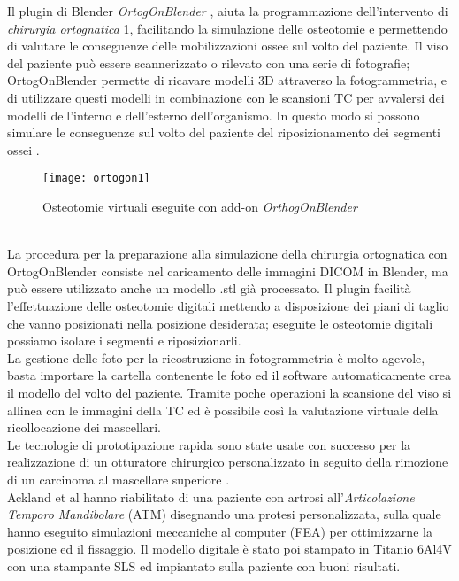 Il plugin di Blender \emph{OrtogOnBlender} \parencite{Reference64}, \parencite{Reference79} aiuta la programmazione dell'inter\-vento di \emph{chirurgia ortognatica} \ref{fig:ortogon1}, facilitando la simulazione delle osteotomie e permettendo di valutare le conseguenze delle mobilizzazioni ossee sul volto del paziente. Il viso del paziente può essere scannerizzato o rilevato con una serie di fotografie; OrtogOnBlender permette di ricavare modelli 3D attraverso la fotogrammetria, e di utilizzare questi modelli in combinazione con le scansioni TC per avvalersi dei modelli dell'interno e dell'esterno dell'orga\-nismo. In questo modo si possono simulare le conseguenze sul volto del paziente del riposizionamento dei segmenti ossei \parencite{Reference145}.
\begin{figure}[h]
\vspace{-10pt}
	\begin{center}
	\texttt{[image: ortogon1]}
    \caption{Osteotomie virtuali eseguite con add-on \emph{OrthogOnBlender}}
    \label{fig:ortogon1}
    \end{center}
\vspace{-20pt}
\end{figure}
\\
La procedura per la preparazione alla simulazione della chirurgia ortognatica con OrtogOnBlender \parencite{Reference80} consiste nel caricamento delle immagini DICOM in Blender, ma può essere utilizzato anche un modello .stl già processato. Il plugin facilità l'effettuazione delle osteotomie digitali mettendo a disposizione dei piani di taglio che vanno posizionati nella posizione desiderata; eseguite le osteotomie digitali possiamo isolare i segmenti e riposizionarli.\\
La gestione delle foto per la ricostruzione in fotogrammetria è molto agevole, basta importare la cartella contenente le foto ed il software automaticamente crea il modello del volto del paziente. Tramite poche operazioni la scansione del viso si allinea con le immagini della TC ed è possibile così la valutazione virtuale della ricollocazione dei mascellari.\\
Le tecnologie di prototipazione rapida sono state usate con successo per la realizzazione di un otturatore chirurgico personalizzato in seguito della rimozione di un carcinoma al mascellare superiore \parencite{Reference81}. \\
Ackland et al \parencite{Reference82} hanno riabilitato di una paziente con artrosi all'\emph{Articolazione Temporo Mandibolare} (ATM) disegnando una protesi personalizzata, sulla quale hanno eseguito simulazioni meccaniche al computer (FEA) per ottimizzarne la posizione ed il fissaggio. Il modello digitale è stato poi stampato in Titanio 6Al4V con una stampante SLS ed impiantato sulla paziente con buoni risultati.\\
